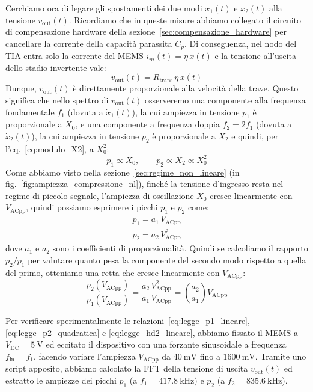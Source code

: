 \documentclass[11pt,a4paper]{article}
\begin{document}
\vspace{0.3cm}
\noindent Cerchiamo ora di legare gli spostamenti dei due modi $x_1(t)$ e $x_2(t)$ alla tensione $v_{\text{out}}(t)$. Ricordiamo che in queste misure abbiamo collegato il circuito di compensazione hardware della sezione~\ref{sec:compensazione_hardware} per cancellare la corrente della capacità parassita $C_p$. Di conseguenza, nel nodo del TIA entra solo la corrente del MEMS $i_m(t) = \eta \, \dot{x}(t)$ e la tensione all'uscita dello stadio invertente vale:
\begin{equation}
    v_{\text{out}}(t) = R_{\text{trans}} \, \eta \, \dot{x}(t)
\end{equation}
Dunque, $v_{\text{out}}(t)$ è direttamente proporzionale alla velocità della trave. Questo significa che nello spettro di $v_{\text{out}}(t)$ osserveremo una componente alla frequenza fondamentale $f_1$ (dovuta a $\dot{x}_1(t)$), la cui ampiezza in tensione $p_1$ è proporzionale a $X_0$, e una componente a frequenza doppia $f_2 = 2 f_1$ (dovuta a $\dot{x}_2(t)$), la cui ampiezza in tensione $p_2$ è proporzionale a $X_2$ e quindi, per l'eq.~\eqref{eq:modulo_X2}, a $X_0^2$:
\begin{equation}
    p_1 \propto X_0, \qquad p_2 \propto X_2 \propto X_0^2
\end{equation}
Come abbiamo visto nella sezione~\ref{sec:regime_non_lineare} (in fig.~\ref{fig:ampiezza_compressione_nl}), finché la tensione d'ingresso resta nel regime di piccolo segnale, l'ampiezza di oscillazione $X_0$ cresce linearmente con $V_{\text{ACpp}}$, quindi possiamo esprimere i picchi $p_1$ e $p_2$ come:
\begin{align}
    \label{eq:legge_p1_lineare}
    p_1 = a_1 \, V_{\text{ACpp}} \\[4pt]
    \label{eq:legge_p2_quadratica}
    p_2 = a_2 \, V_{\text{ACpp}}^2
\end{align}
dove $a_1$ e $a_2$ sono i coefficienti di proporzionalità. Quindi se calcoliamo il rapporto $p_2 / p_1$ per valutare quanto pesa la componente del secondo modo rispetto a quella del primo, otteniamo una retta che cresce linearmente con $V_{\text{ACpp}}$:
\begin{equation}
    \label{eq:legge_hd2_lineare}
    \frac{p_2(V_{\text{ACpp}})}{p_1(V_{\text{ACpp}})} = \frac{a_2 \, V_{\text{ACpp}}^2}{a_1 \, V_{\text{ACpp}}} = \left(\frac{a_2}{a_1}\right) V_{\text{ACpp}}
\end{equation}

\noindent Per verificare sperimentalmente le relazioni~\eqref{eq:legge_p1_lineare}, \eqref{eq:legge_p2_quadratica} e \eqref{eq:legge_hd2_lineare}, abbiamo fissato il MEMS a $V_{\text{DC}} = \SI{5}{\volt}$ ed eccitato il dispositivo con una forzante sinusoidale a frequenza $f_{\text{in}} = f_1$, facendo variare l'ampiezza $V_{\text{ACpp}}$ da $\SI{40}{\milli\volt}$ fino a $\SI{1600}{\milli\volt}$. Tramite uno script apposito, abbiamo calcolato la FFT della tensione di uscita $v_{\text{out}}(t)$ ed estratto le ampiezze dei picchi $p_1$ (a $f_1 = \SI{417.8}{\kilo\hertz}$) e $p_2$ (a $f_2 = \SI{835.6}{\kilo\hertz}$).
\end{document}
